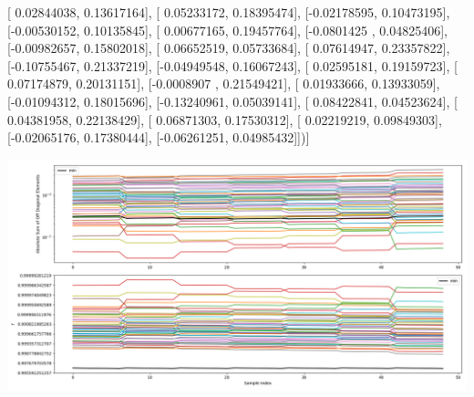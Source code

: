 \documentclass{article}
\begin{document}
       [ 0.02844038,  0.13617164],
       [ 0.05233172,  0.18395474],
       [-0.02178595,  0.10473195],
       [-0.00530152,  0.10135845],
       [ 0.00677165,  0.19457764],
       [-0.0801425 ,  0.04825406],
       [-0.00982657,  0.15802018],
       [ 0.06652519,  0.05733684],
       [ 0.07614947,  0.23357822],
       [-0.10755467,  0.21337219],
       [-0.04949548,  0.16067243],
       [ 0.02595181,  0.19159723],
       [ 0.07174879,  0.20131151],
       [-0.0008907 ,  0.21549421],
       [ 0.01933666,  0.13933059],
       [-0.01094312,  0.18015696],
       [-0.13240961,  0.05039141],
       [ 0.08422841,  0.04523624],
       [ 0.04381958,  0.22138429],
       [ 0.06871303,  0.17530312],
       [ 0.02219219,  0.09849303],
       [-0.02065176,  0.17380444],
       [-0.06261251,  0.04985432]])]
\begin{center}
\includegraphics[scale=.9]{report_pickled_controls151/control_dpn_all.png}

\end{center}
\end{document}
